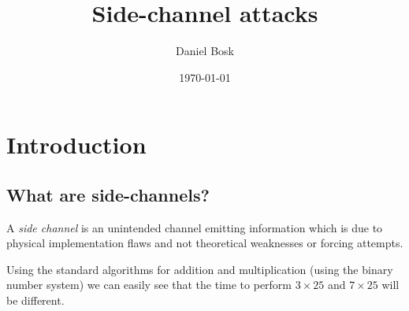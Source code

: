\title{%
  Side-channel attacks
}
\author{Daniel Bosk}
\date{\today}


\begin{frame}
  \maketitle{}
\end{frame}





\section{Introduction}

\subsection{What are side-channels?}

\begin{frame}
  \begin{definition}
    A \emph{side channel} is an unintended channel emitting information which 
    is due to physical implementation flaws and not theoretical weaknesses or 
    forcing attempts.
  \end{definition}
  \begin{example}
    Using the standard algorithms for addition and multiplication (using the 
    binary number system) we can easily see that the time to perform \(3\times 
    25\) and \(7\times 25\) will be different.
  \end{example}
\end{frame}


